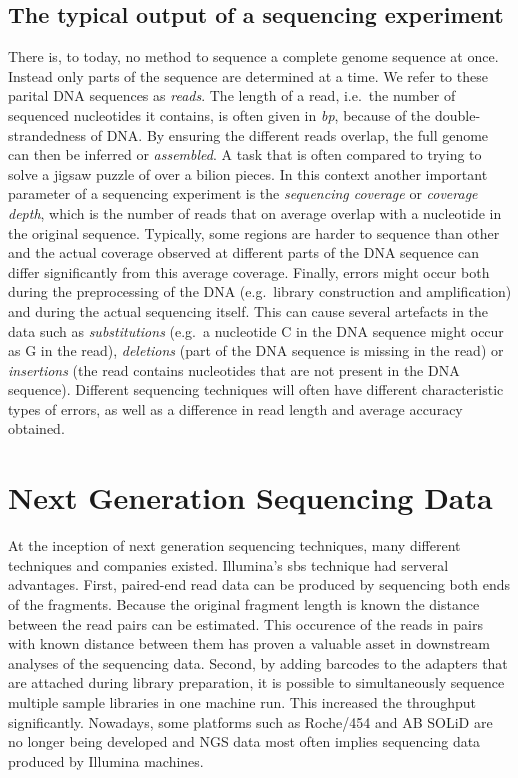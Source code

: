 \subsection{The typical output of a sequencing experiment}

There is, to today, no method to sequence a complete genome sequence at once. Instead only parts of the sequence are determined at a time. We refer to these parital DNA sequences as \emph{reads}. The length of a read, i.e.\ the number of sequenced nucleotides it contains, is often given in \emph{\gls{bp}}, because of the double-strandedness of DNA. By ensuring the different reads overlap, the full genome can then be inferred or \emph{assembled}. A task that is often compared to trying to solve a jigsaw puzzle of over a bilion pieces. In this context another important parameter of a sequencing experiment is the \emph{sequencing coverage} or \emph{coverage depth}, which is the number of reads that on average overlap with a nucleotide in the original sequence. Typically, some regions are harder to sequence than other and the actual coverage observed at different parts of the DNA sequence can differ significantly from this average coverage. Finally, errors might occur both during the preprocessing of the DNA (e.g.\ library construction and amplification) and during the actual sequencing itself. This can cause several artefacts in the data such as \emph{substitutions} (e.g.\ a nucleotide C in the DNA sequence might occur as G in the read), \emph{deletions} (part of the DNA sequence is missing in the read) or \emph{insertions} (the read contains nucleotides that are not present in the DNA sequence). Different sequencing techniques will often have different characteristic types of errors, as well as a difference in read length and average accuracy obtained.

\section{Next Generation Sequencing Data}

At the inception of next generation sequencing techniques, many different techniques and companies existed.
Illumina's \gls{sbs} technique had serveral advantages. First, paired-end read data can be produced by sequencing both ends of the fragments. Because the original fragment length is known the distance between the read pairs can be estimated. This occurence of the reads in pairs with known distance between them has proven a valuable asset in downstream analyses of the sequencing data. Second, by adding barcodes to the adapters that are attached during library preparation, it is possible to simultaneously sequence multiple sample libraries in one machine run. This increased the throughput significantly.
Nowadays, some platforms such as Roche/454 and AB SOLiD are no longer being developed and NGS data most often implies sequencing data produced by Illumina machines.

